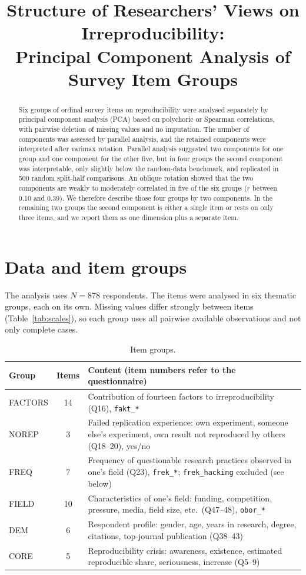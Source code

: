 \documentclass[11pt,a4paper]{article}
\title{Structure of Researchers' Views on Irreproducibility:\\
Principal Component Analysis of Survey Item Groups}
\date{}
\newcommand{\var}[1]{\texttt{#1}}
\begin{document}
\maketitle

\begin{abstract}
\noindent
Six groups of ordinal survey items on reproducibility were analysed separately by principal component analysis (PCA) based on polychoric or Spearman correlations, with pairwise deletion of missing values and no imputation. The number of components was assessed by parallel analysis, and the retained components were interpreted after varimax rotation. Parallel analysis suggested two components for one group and one component for the other five, but in four groups the second component was interpretable, only slightly below the random-data benchmark, and replicated in 500 random split-half comparisons. An oblique rotation showed that the two components are weakly to moderately correlated in five of the six groups ($r$ between 0.10 and 0.39). We therefore describe those four groups by two components. In the remaining two groups the second component is either a single item or rests on only three items, and we report them as one dimension plus a separate item.
\end{abstract}

\section{Data and item groups}

The analysis uses $N=878$ respondents. The items were analysed in six thematic groups, each on its own. Missing values differ strongly between items (Table~\ref{tab:scales}), so each group uses all pairwise available observations and not only complete cases.

\begin{table}[ht]
\centering
\small
\begin{tabular}{@{}l c L{9.2cm}@{}}
\toprule
Group & Items & Content (item numbers refer to the questionnaire)\\
\midrule
FACTORS & 14 & Contribution of fourteen factors to irreproducibility (Q16), \var{fakt\_*}\\
NOREP & 3 & Failed replication experience: own experiment, someone else's experiment, own result not reproduced by others (Q18--20), yes/no\\
FREQ & 7 & Frequency of questionable research practices observed in one's field (Q23), \var{frek\_*}; \var{frek\_hacking} excluded (see below)\\
FIELD & 10 & Characteristics of one's field: funding, competition, pressure, media, field size, etc.\ (Q47--48), \var{obor\_*}\\
DEM & 6 & Respondent profile: gender, age, years in research, degree, citations, top-journal publication (Q38--43)\\
CORE & 5 & Reproducibility crisis: awareness, existence, estimated reproducible share, seriousness, increase (Q5--9)\\
\bottomrule
\end{tabular}
\caption{Item groups.}
\label{tab:groups}
\end{table}
\end{document}
